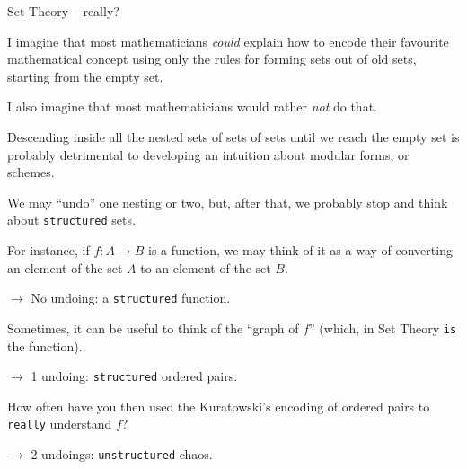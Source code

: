 \documentclass{beamer}
\begin{document}
\begin{frame}[fragile]{Set Theory -- really?}

I imagine that most mathematicians {\emph{could}} explain how to encode their favourite mathematical concept using only the rules for forming sets out of old sets, starting from the empty set.
\bigskip

I also imagine that most mathematicians would rather {\emph{not}} do that.
\bigskip

Descending inside all the nested sets of sets of sets until we reach the empty set is probably detrimental to developing an intuition about modular forms, or schemes.
\end{frame}

\begin{frame}[fragile]

We may ``undo'' one nesting or two, but, after that, we probably stop and think about {\color{violet}\verb`structured`} sets.
\bigskip

For instance, if $f \colon A \longrightarrow B$ is a function, we may think of it as a way of converting an element of the set $A$ to an element of the set $B$.

$\to$ No undoing: a {\color{violet}\verb`structured`} function.
\bigskip

Sometimes, it can be useful to think of the ``graph of $f$'' (which, in Set Theory {\color{violet}\verb`is`} the function).

$\to$ 1 undoing: {\color{violet}\verb`structured`} ordered pairs.
\bigskip

How often have you then used the Kuratowski's encoding of ordered pairs to {\color{violet}\verb`really`} understand $f$?

$\to$ 2 undoings: {\color{violet}\verb`unstructured`} chaos.
\end{frame}
\end{document}
